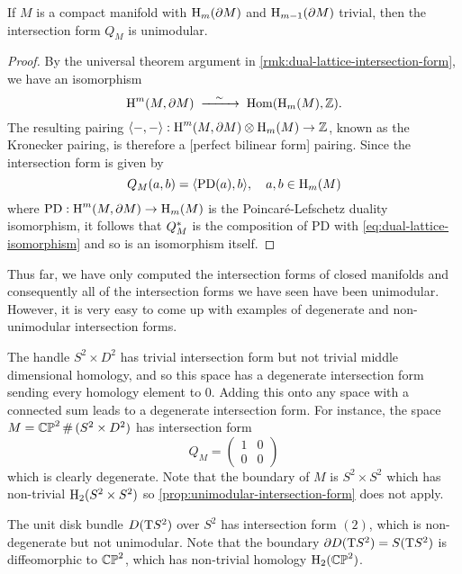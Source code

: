 \begin{proposition}\label{prop:unimodular-intersection-form}
	 If $M$ is a compact manifold with $\operatorname{H}_m(\partial M)$ and $\operatorname{H}_{m-1}(\partial M)$ trivial, then the intersection form $Q_M$ is unimodular.
\end{proposition}
\begin{proof}
	By the universal theorem argument in \cref{rmk:dual-lattice-intersection-form}, we have an isomorphism
	\begin{equation}\label{eq:dual-lattice-isomorphism}
		\H^m(M,\partial M) \lkxisom \Hom(\H_m(M), \Z).
	\end{equation}
	The resulting pairing $\langle -, -\rangle : \operatorname{H}^m(M,\partial M)\otimes \operatorname{H}_m(M) \to \mathbb{Z}$, known as the Kronecker pairing, is therefore a [perfect bilinear form] pairing. Since the intersection form is given by
	\[
		Q_M(a,b) = \langle \mathrm{PD}(a), b\rangle,\quad a,b\in \operatorname{H}_m(M)
	\]
	where $\mathrm{PD} : \operatorname{H}^{m}(M,\partial M) \to \operatorname{H}_m(M)$ is the Poincar\'e-Lefschetz duality isomorphism, it follows that $Q_M^*$ is the composition of $\mathrm{PD}$ with \cref{eq:dual-lattice-isomorphism} and so is an isomorphism itself.
\end{proof}

Thus far, we have only computed the intersection forms of closed manifolds and consequently all of the intersection forms we have seen have been unimodular. However, it is very easy to come up with examples of degenerate and non-unimodular intersection forms. 

\begin{example}
	The handle $S^2\times D^2$ has trivial intersection form but not trivial middle dimensional homology, and so this space has a degenerate intersection form sending every homology element to $0$. Adding this onto any space with a connected sum leads to a degenerate intersection form.
	For instance, the space $M=\CP^2\+(S^2\times D^2)$ has intersection form
	\[
		Q_M = \begin{pmatrix}
			1 & 0 \\ 0 & 0
		\end{pmatrix}
	\]
	which is clearly degenerate. Note that the boundary of $M$ is $S^2\times S^2$ which has non-trivial $\operatorname{H}_2(S^2\times S^2)$ so \cref{prop:unimodular-intersection-form} does not apply.
\end{example}

\begin{example}
	The unit disk bundle $D(\mathrm{T} S^2)$ over $S^2$ has intersection form $(2)$, which is non-degenerate but not unimodular. Note that the boundary $\partial D(\mathrm{T} S^2)= S(\mathrm{T} S^2)$ is diffeomorphic to $\mathbb{CP}^2$, which has non-trivial homology $\operatorname{H}_2(\mathbb{CP}^2)$.
\end{example}

